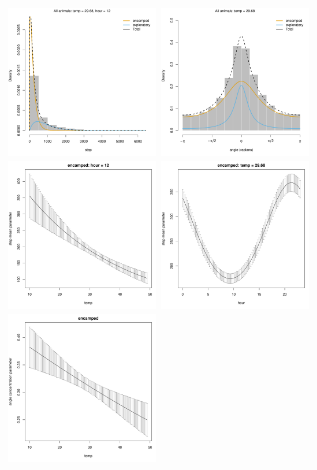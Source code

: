 \documentclass[12pt]{article}\usepackage[]{graphicx}\usepackage[]{xcolor}
\begin{document}
\begin{figure}[htbp]
  \centering
  \includegraphics[width=0.35\textwidth]{plot_elephantResults009.pdf}
  \includegraphics[width=0.35\textwidth]{plot_elephantResults012.pdf} \\
  \includegraphics[width=0.35\textwidth]{plot_elephantResults001.pdf} 
  \includegraphics[width=0.35\textwidth]{plot_elephantResults002.pdf} \\
  \includegraphics[width=0.35\textwidth]{plot_elephantResults010.pdf}

\end{figure}
\end{document}
